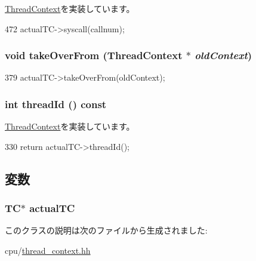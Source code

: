\hyperlink{classThreadContext_ae5fdd7da5d82e981c65cbd6115dcfe60}{ThreadContext}を実装しています。


\begin{DoxyCode}
472     { actualTC->syscall(callnum); }
\end{DoxyCode}
\hypertarget{classProxyThreadContext_a5811640aa3008d2916f3d3aba621b82d}{
\subsubsection[{takeOverFrom}]{\setlength{\rightskip}{0pt plus 5cm}void takeOverFrom ({\bf ThreadContext} $\ast$ {\em oldContext})}}
\label{classProxyThreadContext_a5811640aa3008d2916f3d3aba621b82d}



\begin{DoxyCode}
379     { actualTC->takeOverFrom(oldContext); }
\end{DoxyCode}
\hypertarget{classProxyThreadContext_afc38d04c77e7b5fc3bbb0dd00fc87742}{
\subsubsection[{threadId}]{\setlength{\rightskip}{0pt plus 5cm}int threadId () const}}
\label{classProxyThreadContext_afc38d04c77e7b5fc3bbb0dd00fc87742}


\hyperlink{classThreadContext_a79882224329589b18076ee3f2f45d99f}{ThreadContext}を実装しています。


\begin{DoxyCode}
330 { return actualTC->threadId(); }
\end{DoxyCode}


\subsection{変数}
\hypertarget{classProxyThreadContext_af006a89ce9ad7b3b522cba1d69d950da}{
\subsubsection[{actualTC}]{\setlength{\rightskip}{0pt plus 5cm}TC$\ast$ {\bf actualTC}}}
\label{classProxyThreadContext_af006a89ce9ad7b3b522cba1d69d950da}


このクラスの説明は次のファイルから生成されました:\begin{DoxyCompactItemize}
\item 
cpu/\hyperlink{thread__context_8hh}{thread\_\-context.hh}\end{DoxyCompactItemize}
